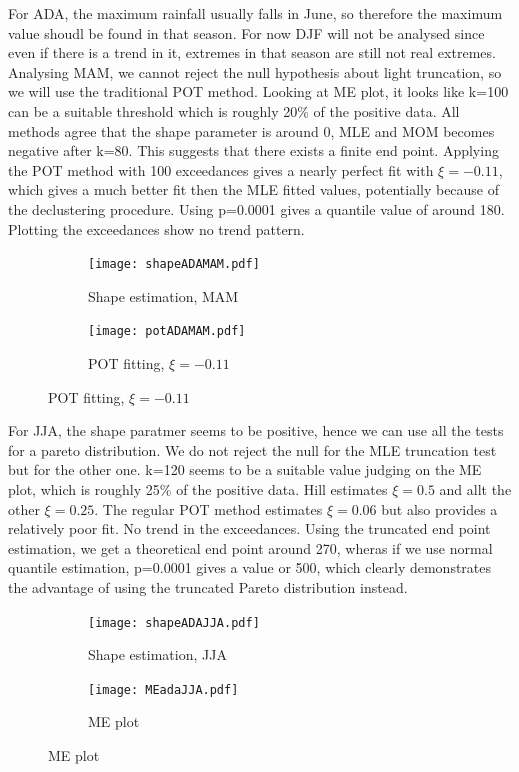 \documentclass{article}
\begin{document}
	For ADA, the maximum rainfall usually falls in June, so therefore the maximum value shoudl be found in that season. For now DJF will not be analysed since even if there is a trend in it, extremes in that season are still not real extremes. Analysing MAM, we cannot reject the null hypothesis about light truncation, so we will use the traditional POT method. Looking at ME plot, it looks like k=100 can be a suitable threshold which is roughly 20\% of the positive data. All methods agree that the shape parameter is around 0, MLE and MOM becomes negative after k=80. This suggests that there exists a finite end point. Applying the POT method with 100 exceedances gives a nearly perfect fit with $\xi = -0.11$, which gives a much better fit then the MLE fitted values, potentially because of the declustering procedure. Using p=0.0001 gives a quantile value of around 180. Plotting the exceedances show no trend pattern.
	\begin{figure}
		\begin{subfigure}{0.5\textwidth}
			\texttt{[image: shapeADAMAM.pdf]}
			\caption{Shape estimation, MAM}
		\end{subfigure}%
		\begin{subfigure}{0.5\textwidth}
			\texttt{[image: potADAMAM.pdf]}
			\caption{POT fitting, $\xi = -0.11$}
		\end{subfigure}
	\end{figure}

	For JJA, the shape paratmer seems to be positive, hence we can use all the tests for a pareto distribution. We do not reject the null for the MLE truncation test but for the other one. k=120 seems to be a suitable value judging on the ME plot, which is roughly 25\% of the positive data. Hill estimates $\xi = 0.5$ and allt the other $\xi = 0.25$. The regular POT method estimates $\xi = 0.06$ but also provides a relatively poor fit. No trend in the exceedances. Using the truncated end point estimation, we get a theoretical end point around 270, wheras if we use normal quantile estimation, p=0.0001 gives a value or 500, which clearly demonstrates the advantage of using the truncated Pareto distribution instead. 
	
	\begin{figure}[H]
		\begin{subfigure}{0.5\textwidth}
			\texttt{[image: shapeADAJJA.pdf]}
			\caption{Shape estimation, JJA}
		\end{subfigure}%
		\begin{subfigure}{0.5\textwidth}
			\texttt{[image: MEadaJJA.pdf]}
			\caption{ME plot}
		\end{subfigure}
	\end{figure}
\end{document}
